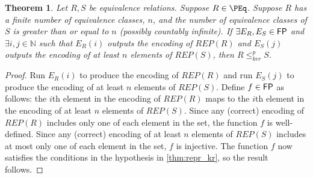 \documentclass{article}
\newtheorem{theorem}{Theorem}[section]
\theoremstyle{definition} \newtheorem{definition}[definition]{Definition}
\newcommand{\kr}{\leq^{p}_{ker}} %
\newcommand{\defn}[1]{\emph{#1}} %
\begin{document}
\begin{theorem}
  Let $R,S$ be equivalence relations. Suppose $R\in\PEq$. Suppose $R$ has a
  finite number of equivalence classes, $n$, and the number of equivalence
  classes of $S$ is greater than or equal to $n$ (possibly countably
  infinite). If $\exists E_R,E_S\in{\ensuremath{\mathsf{FP}}}$ and $\exists i,j\in\mathbb{N}$ such
  that $E_R(i)$ outputs the encoding of $REP(R)$ and $E_S(j)$ outputs the
  encoding of at least $n$ elements of $REP(S)$, then $R\kr S$.
\end{theorem}
\begin{proof}
  Run $E_R(i)$ to produce the encoding of $REP(R)$ and run $E_S(j)$ to produce
  the encoding of at least $n$ elements of $REP(S)$. Define $f\in{\ensuremath{\mathsf{FP}}}$ as
  follows: the $i\text{th}$ element in the encoding of $REP(R)$ maps to the
  $i\text{th}$ element in the encoding of at least $n$ elements of
  $REP(S)$. Since any (correct) encoding of $REP(R)$ includes only one of each
  element in the set, the function $f$ is well-defined. Since any (correct)
  encoding of at least $n$ elements of $REP(S)$ includes at most only one of
  each element in the set, $f$ is injective. The function $f$ now satisfies the
  conditions in the hypothesis in \autoref{thm:repr_kr}, so the result follows.
\end{proof}




\end{document}
